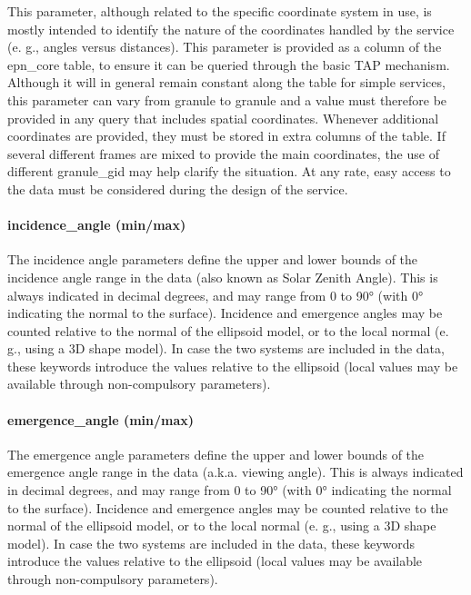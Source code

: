 \documentclass[11pt,a4paper]{ivoa}
\begin{document}
This parameter, although related to the specific coordinate system in use, is mostly intended to identify the nature of the coordinates handled by the service (e. g., angles versus distances). This parameter is provided as a column of the epn\_core table, to ensure it can be queried through the basic TAP mechanism. Although it will in general remain constant along the table for simple services, this parameter can vary from granule to granule and a value must therefore be provided in any query that includes spatial coordinates. Whenever additional coordinates are provided, they must be stored in extra columns of the table. If several different frames are mixed to provide the main coordinates, the use of different granule\_gid may help clarify the situation. At any rate, easy access to the data must be considered during the design of the service. 

\paragraph{incidence\_angle (min/max)}

The incidence angle parameters define the upper and lower bounds of the incidence angle range in the data (also known as Solar Zenith Angle). This is always indicated in decimal degrees, and may range from 0 to 90° (with 0° indicating the normal to the surface). Incidence and emergence angles may be counted relative to the normal of the ellipsoid model, or to the local normal (e. g., using a 3D shape model). In case the two systems are included in the data, these keywords introduce the values relative to the ellipsoid (local values may be available through non-compulsory parameters).

\paragraph{emergence\_angle (min/max)}

The emergence angle parameters define the upper and lower bounds of the emergence angle range in the data (a.k.a. viewing angle). This is always indicated in decimal degrees, and may range from 0 to 90° (with 0° indicating the normal to the surface). Incidence and emergence angles may be counted relative to the normal of the ellipsoid model, or to the local normal (e. g., using a 3D shape model). In case the two systems are included in the data, these keywords introduce the values relative to the ellipsoid (local values may be available through non-compulsory parameters).
\end{document}
